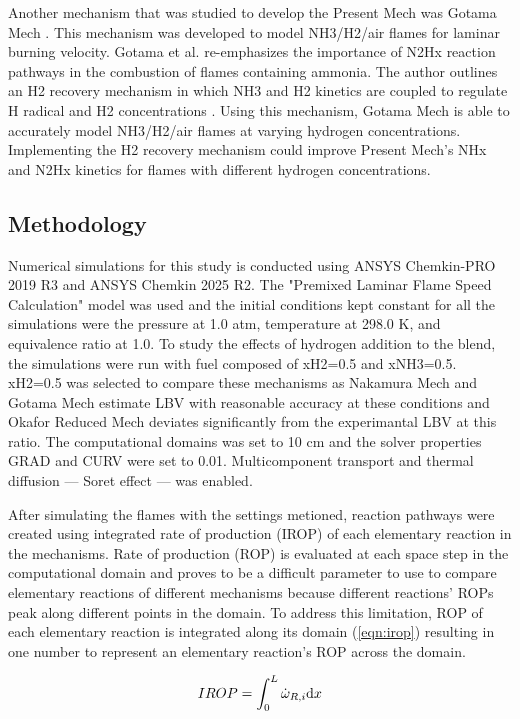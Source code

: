 \documentclass[10pt,twocolumn]{icfd2026paper}
\begin{document}
Another mechanism that was studied to develop the Present Mech was Gotama Mech \cite{gotamaMeasurement2022}.
This mechanism was developed to model NH3/H2/air flames for laminar burning velocity. Gotama et al. re-emphasizes the
importance of N2Hx reaction pathways in the combustion of flames containing ammonia. The author outlines an H2 recovery
mechanism in which NH3 and H2 kinetics are coupled to regulate H radical and H2 concentrations \cite{otomoChemical2018}.
Using this mechanism, Gotama Mech is able to accurately model NH3/H2/air flames at varying hydrogen concentrations.
Implementing the H2 recovery mechanism could improve Present Mech's NHx and N2Hx kinetics for flames with different
hydrogen concentrations.

\subsection{Methodology}

Numerical simulations for this study is conducted using ANSYS Chemkin-PRO 2019 R3 and ANSYS Chemkin 2025 R2. The
"Premixed Laminar Flame Speed Calculation" model was used and the initial conditions kept constant for all the
simulations were the pressure at 1.0 atm, temperature at 298.0 K, and equivalence ratio at 1.0. To study the effects of
hydrogen addition to the blend, the simulations were run with fuel composed of xH2=0.5 and xNH3=0.5. xH2=0.5 was
selected to compare these mechanisms as Nakamura Mech and Gotama Mech estimate LBV with reasonable accuracy at these
conditions and Okafor Reduced Mech deviates significantly from the experimantal LBV at this ratio. The computational
domains was set to 10 cm and the solver properties GRAD and CURV were set to 0.01. Multicomponent transport and thermal
diffusion --- Soret effect --- was enabled.

After simulating the flames with the settings metioned, reaction pathways were created using integrated rate of
production (IROP) of each elementary reaction in the mechanisms. Rate of production (ROP) is evaluated at each space
step in the computational domain and proves to be a difficult parameter to use to compare elementary reactions of
different mechanisms because different reactions' ROPs peak along different points in the domain. To address this
limitation, ROP of each elementary reaction is integrated along its domain (\ref{eqn:irop}) resulting in one number to
represent an elementary reaction's ROP across the domain. 

\begin{eqnarray}
	IROP=\int_0^L\dot\omega_{R,i}\text dx
	\label{eqn:irop}
\end{eqnarray}
\end{document}
